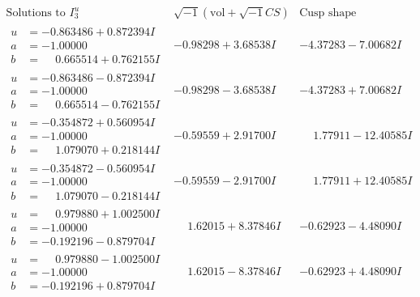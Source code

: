 \documentclass[1p]{elsarticle_modified}
\theoremstyle{definition}
\newcommand{\I}{\sqrt{-1}}
\begin{document}
$$\begin{array}{c|c|c}  
\text{Solutions to }I^u_{3}& \I (\text{vol} + \sqrt{-1}CS) & \text{Cusp shape}\\
 \hline 
\begin{aligned}
u &= -0.863486 + 0.872394 I \\
a &= -1.00000\phantom{ +0.000000I} \\
b &= \phantom{-}0.665514 + 0.762155 I\end{aligned}
 & -0.98298 + 3.68538 I & -4.37283 - 7.00682 I \\ \hline\begin{aligned}
u &= -0.863486 - 0.872394 I \\
a &= -1.00000\phantom{ +0.000000I} \\
b &= \phantom{-}0.665514 - 0.762155 I\end{aligned}
 & -0.98298 - 3.68538 I & -4.37283 + 7.00682 I \\ \hline\begin{aligned}
u &= -0.354872 + 0.560954 I \\
a &= -1.00000\phantom{ +0.000000I} \\
b &= \phantom{-}1.079070 + 0.218144 I\end{aligned}
 & -0.59559 + 2.91700 I & \phantom{-}1.77911 - 12.40585 I \\ \hline\begin{aligned}
u &= -0.354872 - 0.560954 I \\
a &= -1.00000\phantom{ +0.000000I} \\
b &= \phantom{-}1.079070 - 0.218144 I\end{aligned}
 & -0.59559 - 2.91700 I & \phantom{-}1.77911 + 12.40585 I \\ \hline\begin{aligned}
u &= \phantom{-}0.979880 + 1.002500 I \\
a &= -1.00000\phantom{ +0.000000I} \\
b &= -0.192196 - 0.879704 I\end{aligned}
 & \phantom{-}1.62015 + 8.37846 I & -0.62923 - 4.48090 I \\ \hline\begin{aligned}
u &= \phantom{-}0.979880 - 1.002500 I \\
a &= -1.00000\phantom{ +0.000000I} \\
b &= -0.192196 + 0.879704 I\end{aligned}
 & \phantom{-}1.62015 - 8.37846 I & -0.62923 + 4.48090 I \\ \hline\begin{aligned}

\end{aligned}
\end{array}$$
\end{document}
